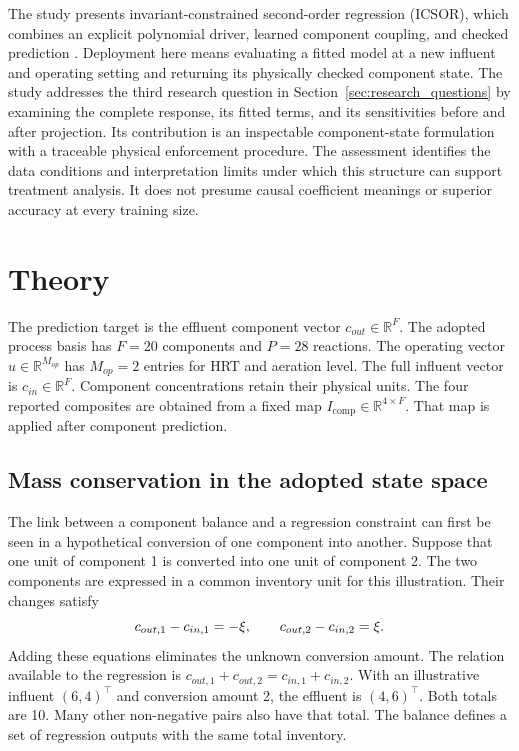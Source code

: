 The study presents invariant-constrained second-order regression (ICSOR), which combines an explicit polynomial driver, learned component coupling, and checked prediction \citep{Selerio2026}. Deployment here means evaluating a fitted model at a new influent and operating setting and returning its physically checked component state. The study addresses the third research question in Section~\ref{sec:research_questions} by examining the complete response, its fitted terms, and its sensitivities before and after projection. Its contribution is an inspectable component-state formulation with a traceable physical enforcement procedure. The assessment identifies the data conditions and interpretation limits under which this structure can support treatment analysis. It does not presume causal coefficient meanings or superior accuracy at every training size.

\section{Theory}

The prediction target is the effluent component vector \(c_{out}\in\mathbb{R}^{F}\). The adopted process basis has \(F=20\) components and \(P=28\) reactions. The operating vector \(u\in\mathbb{R}^{M_{op}}\) has \(M_{op}=2\) entries for HRT and aeration level. The full influent vector is \(c_{in}\in\mathbb{R}^{F}\). Component concentrations retain their physical units. The four reported composites are obtained from a fixed map \(I_{\mathrm{comp}}\in\mathbb{R}^{4\times F}\). That map is applied after component prediction.

\subsection{Mass conservation in the adopted state space}

The link between a component balance and a regression constraint can first be seen in a hypothetical conversion of one component into another. Suppose that one unit of component 1 is converted into one unit of component 2. The two components are expressed in a common inventory unit for this illustration. Their changes satisfy
\begin{equation}
\equationname{Illustrative component changes for a two-component reaction}
\label{eq:icsor_scalar_inventory_example}
c_{out,1}-c_{in,1}=-\xi,
\qquad
c_{out,2}-c_{in,2}=\xi.
\end{equation}
Adding these equations eliminates the unknown conversion amount. The relation available to the regression is \(c_{out,1}+c_{out,2}=c_{in,1}+c_{in,2}\). With an illustrative influent \((6,4)^\top\) and conversion amount 2, the effluent is \((4,6)^\top\). Both totals are 10. Many other non-negative pairs also have that total. The balance defines a set of regression outputs with the same total inventory.

